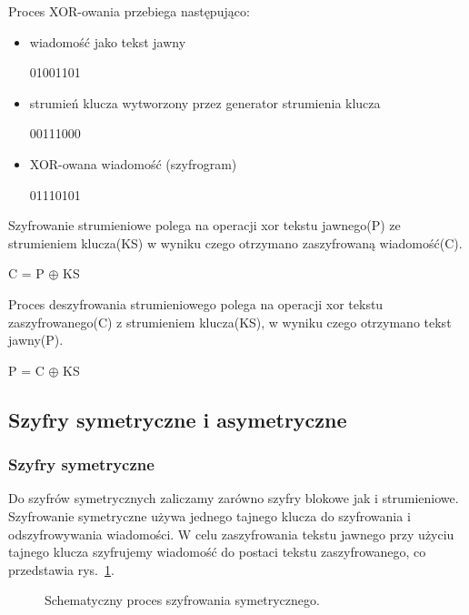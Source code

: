\documentclass[12p]{article}
\begin{document}
Proces XOR-owania przebiega następująco:
\begin{itemize}
\item wiadomość jako tekst jawny \newline
\begin{center}
01001101
\end{center}
\item strumień klucza wytworzony przez generator strumienia klucza \newline
\begin{center}
00111000
\end{center}
\item XOR-owana wiadomość (szyfrogram) \newline
\begin{center}
01110101
\end{center}
\end{itemize}
Szyfrowanie strumieniowe polega na operacji xor tekstu jawnego(P) ze strumieniem klucza(KS) w wyniku czego otrzymano zaszyfrowaną wiadomość(C).\newline
\begin{center}
C = P $\oplus$ KS
\end{center}
Proces deszyfrowania strumieniowego polega na operacji xor tekstu zaszyfrowanego(C) z strumieniem klucza(KS), w wyniku czego otrzymano tekst jawny(P).~\cite{stream_cipher}\newline
\begin{center}
P = C $\oplus$ KS
\end{center}

\subsection{Szyfry symetryczne i asymetryczne}

\subsubsection{Szyfry symetryczne}
\quad Do szyfrów symetrycznych zaliczamy zarówno szyfry blokowe jak i strumieniowe. Szyfrowanie symetryczne używa jednego tajnego klucza do szyfrowania i odszyfrowywania wiadomości. W celu zaszyfrowania tekstu jawnego przy użyciu tajnego klucza szyfrujemy wiadomość do postaci tekstu zaszyfrowanego, co przedstawia rys.~\ref{szyfrowanie}.
\newline
\begin{figure}[H]
\begin{center}
\end{center}
\caption{Schematyczny proces szyfrowania symetrycznego.}\label{szyfrowanie}
\end{figure}
\end{document}
